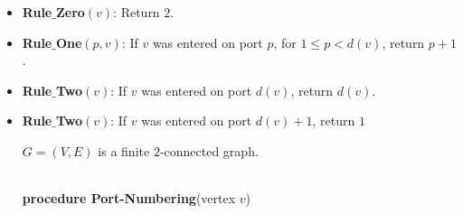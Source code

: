 \documentclass[12pt]{article}
\author{Samson Bassett}
\begin{document}





 \begin{itemize} 
\item \textbf{Rule$\_$Zero}$(v)$: Return $2$. 

\item \textbf{Rule$\_$One}$(p,v)$: If $v$ was entered on port $p$, for $1\le p<d(v)$, return $p+1$.  

\item \textbf{Rule$\_$Two}$(v)$: If $v$ was entered on port $d(v)$, return $d(v)$.

\item \textbf{Rule$\_$Two}$(v)$: If $v$ was entered on port $d(v)+1$, return $1$ 



$G=(V,E)$ is a finite $2$-connected graph.  %




\begin{center}\begin{tabular*}{\textwidth}{c}\hline\end{tabular*}\end{center}
\noindent \textbf{procedure Port-Numbering}(vertex $v$)
\begin{algorithmic}[1] 
 

\ENDIF %






\end{algorithmic}
\end{itemize}
\end{document}
